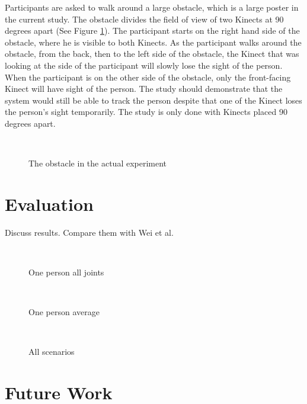 \documentclass{sigchi}
\begin{document}
Participants are asked to walk around a large obstacle, which is a large poster in the current study. The obstacle divides the field of view of two Kinects at 90 degrees apart (See Figure \ref{fig:studies_obstacle}). The participant starts on the right hand side of the obstacle, where he is visible to both Kinects. As the participant walks around the obstacle, from the back, then to the left side of the obstacle, the Kinect that was looking at the side of the participant will slowly lose the sight of the person. When the participant is on the other side of the obstacle, only the front-facing Kinect will have sight of the person. The study should demonstrate that the system would still be able to track the person despite that one of the Kinect loses the person's sight temporarily. The study is only done with Kinects placed 90 degrees apart.

\begin{figure}[!h]
  \centering
  
  \caption{The obstacle in the actual experiment}~\label{fig:studies_obstacle}
\end{figure}

\section{Evaluation}
\label{sec:evaluation}

Discuss results. Compare them with Wei et al.

\begin{figure}[!h]
  \centering
  
  \caption{One person all joints}~\label{fig:one_person_all}
\end{figure}

\begin{figure}[!h]
  \centering
  
  \caption{One person average}~\label{fig:one_person_average}
\end{figure}

\begin{figure}[!h]
  \centering
  
  \caption{All scenarios}~\label{fig:scenarios}
\end{figure}

\section{Future Work}
\label{sec:future_work}
\end{document}
